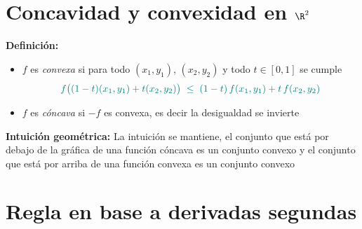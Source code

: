 \documentclass{article}
\begin{document}
\begin{center}
\end{center}


\section*{Concavidad y convexidad en $\R^2$}

\noindent\textbf{Definición:}
\begin{itemize}
  \item \(f\) es \emph{convexa} si para todo \((x_1,y_1)\), \((x_2,y_2)\) y todo \(t\in[0,1]\) se cumple
  \[
    \color{teal}
    f\bigl((1-t)(x_1,y_1)+t(x_2,y_2)\bigr)
    \;\le\;
    (1-t)\,f(x_1,y_1) + t\,f(x_2,y_2)
  \]
  \item \(f\) es \emph{cóncava} si \(-f\) es convexa, es decir la desigualdad se invierte
\end{itemize}

\noindent\textbf{Intuición geométrica:} La intuición se mantiene, el conjunto que está por debajo de la gráfica de una función cóncava es un conjunto convexo y el conjunto que está por arriba de una función convexa es un conjunto convexo

\section*{Regla en base a derivadas segundas}
\end{document}
